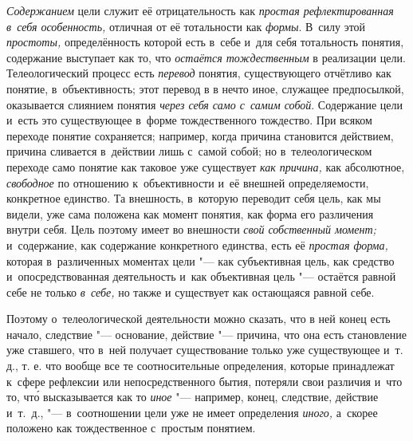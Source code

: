 {\em Содержанием} цели
служит её отрицательность как
{\em простая рефлектированная в~себя
особенность,} отличная от её тотальности как
{\em формы}. В~силу этой
{\em простоты,}
определённость которой есть в~себе и~для себя тотальность
понятия, содержание выступает как то, что
{\em остаётся тождественным}
в реализации цели. Телеологический процесс есть
{\em перевод} понятия,
существующего отчётливо как понятие, в~объективность; этот перевод в
в нечто иное, служащее предпосылкой, оказывается слиянием понятия
{\em через себя само с~самим собой}.
Содержание цели и~есть это существующее в~форме
тождественного тождество. При всяком переходе понятие сохраняется;
например, когда причина становится действием, причина сливается в~действии
лишь с~самой собой; но в~телеологическом переходе само понятие как таковое
уже существует {\em как причина,}
как абсолютное,
{\em свободное} по
отношению к~объективности и~её внешней определяемости, конкретное единство.
Та внешность, в~которую переводит себя цель, как мы видели, уже сама
положена как момент понятия, как форма его различения внутри себя. Цель
поэтому имеет во внешности {\em свой
собственный момент;} и~содержание, как содержание
конкретного единства, есть её
{\em простая форма,}
которая в~различенных моментах цели "--- как
субъективная цель, как средство и~опосредствованная деятельность и~как
объективная цель "--- остаётся равной себе не только
{\em в~себе,} но также и
существует как остающаяся равной себе.

Поэтому о~телеологической деятельности можно сказать, что в
ней конец есть начало, следствие "--- основание, действие
"--- причина, что она есть становление уже ставшего, что в~ней
получает существование только уже существующее и~т. д., т. е. что вообще
все те соотносительные определения, которые принадлежат к~сфере рефлексии
или непосредственного бытия, потеряли свои различия и~что то, чт\'{о}
высказывается как то
{\em иное} "--- например,
конец, следствие, действие и~т.~д., "--- в~соотношении цели уже
не имеет определения
{\em иного,} а~скорее
положено как тождественное с~простым понятием.

